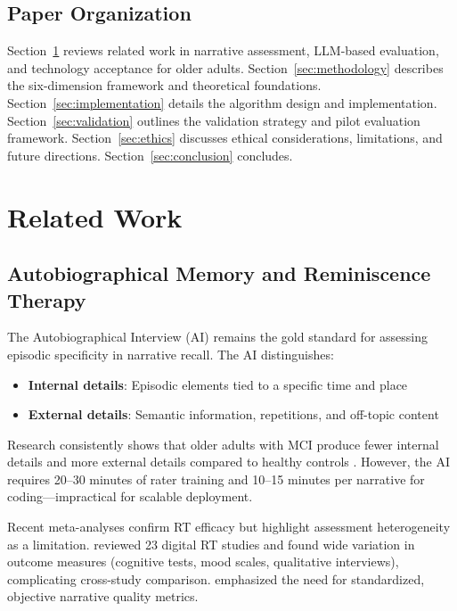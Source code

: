 \documentclass[11pt]{article}
\begin{document}
\subsection{Paper Organization}

Section~\ref{sec:related} reviews related work in narrative assessment, LLM-based evaluation, and technology acceptance for older adults. Section~\ref{sec:methodology} describes the six-dimension framework and theoretical foundations. Section~\ref{sec:implementation} details the algorithm design and implementation. Section~\ref{sec:validation} outlines the validation strategy and pilot evaluation framework. Section~\ref{sec:ethics} discusses ethical considerations, limitations, and future directions. Section~\ref{sec:conclusion} concludes.


\section{Related Work}\label{sec:related}

\subsection{Autobiographical Memory and Reminiscence Therapy}

The Autobiographical Interview (AI) \citep{levine2002} remains the gold standard for assessing episodic specificity in narrative recall. The AI distinguishes:
\begin{itemize}
    \item \textbf{Internal details}: Episodic elements tied to a specific time and place
    \item \textbf{External details}: Semantic information, repetitions, and off-topic content
\end{itemize}

Research consistently shows that older adults with MCI produce fewer internal details and more external details compared to healthy controls \citep{irish2024, barnhofer2025}. However, the AI requires 20--30 minutes of rater training and 10--15 minutes per narrative for coding---impractical for scalable deployment.

Recent meta-analyses confirm RT efficacy but highlight assessment heterogeneity as a limitation. \citet{pu2025} reviewed 23 digital RT studies and found wide variation in outcome measures (cognitive tests, mood scales, qualitative interviews), complicating cross-study comparison. \citet{ni2026} emphasized the need for standardized, objective narrative quality metrics.
\end{document}
